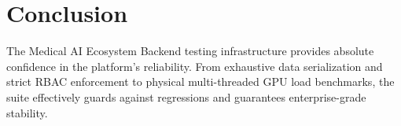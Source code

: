 \documentclass[11pt, a4paper]{article}
\begin{document}
\section{Conclusion}
The Medical AI Ecosystem Backend testing infrastructure provides absolute confidence in the platform's reliability. From exhaustive data serialization and strict RBAC enforcement to physical multi-threaded GPU load benchmarks, the suite effectively guards against regressions and guarantees enterprise-grade stability.
\end{document}

